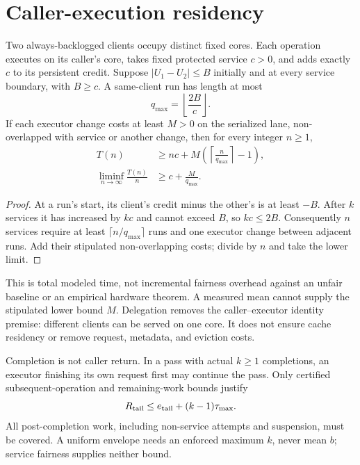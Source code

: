 \section{Caller-execution residency}
\label{app:residency}
\begin{proposition}
\label{prop:appendixresidency}
Two always-backlogged clients occupy distinct fixed cores. Each operation
executes on its caller's core, takes fixed protected service $c>0$, and adds
exactly $c$ to its persistent credit. Suppose $|U_1-U_2|\le B$ initially and
at every service boundary, with $B\ge c$. A same-client run has length at most
\begin{equation}
 q_{\max}=\left\lfloor\frac{2B}{c}\right\rfloor.
\end{equation}
If each executor change costs at least $M>0$ on the serialized lane,
non-overlapped with service or another change, then for every integer $n\ge1$,
\begin{equation}
 \begin{aligned}
 T(n)&\ge nc+M\left(\left\lceil\frac{n}{q_{\max}}\right\rceil-1\right),\\
 \liminf_{n\to\infty}\frac{T(n)}n&\ge c+\frac{M}{q_{\max}}.
 \end{aligned}
\end{equation}
\end{proposition}
\begin{proof}
At a run's start, its client's credit minus the other's is at least $-B$.
After $k$ services it has increased by $kc$ and cannot exceed $B$, so
$kc\le2B$. Consequently $n$ services require at least
$\lceil n/q_{\max}\rceil$ runs and one executor change between adjacent
runs. Add their stipulated non-overlapping costs; divide by $n$ and take
the lower limit.
\end{proof}
This is total modeled time, not incremental fairness overhead against an
unfair baseline or an empirical hardware theorem. A measured mean cannot
supply the stipulated lower bound $M$. Delegation removes the caller--executor
identity premise: different clients can be served on one core. It does not
ensure cache residency or remove request, metadata, and eviction costs.

Completion is not caller return. In a pass with actual $k\ge1$ completions,
an executor finishing its own request first may continue the pass. Only
certified subsequent-operation and remaining-work bounds justify
\begin{equation}
 R_{\rm tail}\le e_{\rm tail}+(k-1)\tau_{\max}.
\end{equation}
All post-completion work, including non-service attempts and suspension,
must be covered. A uniform envelope needs an enforced maximum $k$, never
mean $b$; service fairness supplies neither bound.

